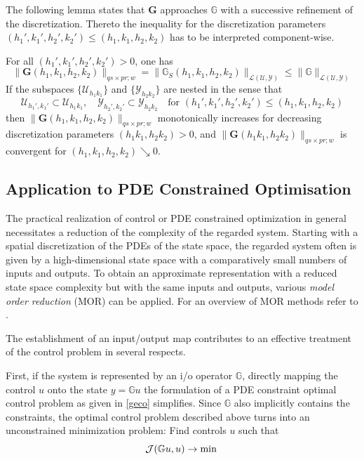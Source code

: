 \documentclass[a4paper,10pt,BCOR=15mm]{scrbook}
\providecommand{\norm}[1]{\lVert#1 \rVert}
\begin{document}
The following lemma states that $\mathbf G$ approaches $\mathbb G$ with a successive refinement of the discretization. Thereto the inequality for the discretization parameters $(h_1',k_1',h_2',k_2') \leq (h_1,k_1,h_2,k_2)$ has to be interpreted component-wise.

\begin{lema}
 For all $(h_1',k_1',h_2',k_2') > 0$, one has
\begin{equation*}
 \norm{ \mathbf G(h_1,k_1,h_2,k_2)}_{qs \times pr ; w} =  \norm{ \mathbb G_S(h_1,k_1,h_2,k_2)}_{\mathscr L(\mathcal U,\mathcal Y)} \leq  \norm{ \mathbb G}_{\mathscr L({\mathcal U,\mathcal Y})}
\end{equation*}
If the subspaces $\{ \mathcal U_{h_1k_1}\}$ and $\{ \mathcal Y_{h_2k_2}\}$ are nested in the sense that
\begin{equation*}
  \mathcal U_{h_1',k_1'}\subset  \mathcal U_{h_1k_1}, \quad \mathcal Y_{h_2',k_2'} \subset \mathcal Y_{h_2k_2} \quad \text{for  }(h_1',k_1',h_2',k_2') \leq (h_1,k_1,h_2,k_2)
\end{equation*}
then $\norm{ \mathbf G(h_1,k_1,h_2,k_2)}_{qs \times pr ; w}$ monotonically increases for decreasing discretization parameters $(h_1k_1,h_2k_2) > 0$, and $\norm{ \mathbf G(h_1k_1,h_2k_2)}_{qs \times pr ; w}$ is convergent for $ (h_1,k_1,h_2,k_2) \searrow 0$.
\end{lema}




\subsection{Application to PDE Constrained Optimisation}

The practical realization of control or PDE constrained optimization in general necessitates a reduction of the complexity of the regarded system. Starting with a spatial discretization of the PDEs of the state space, the regarded system often is given by a high-dimensional state space with a comparatively small numbers of inputs and outputs. To obtain an approximate representation with a reduced state space complexity but with the same inputs and outputs, various \textit{model order reduction} (MOR) can be applied. For an overview of MOR methods refer to \cite{antou, bemeso,schm}.

The establishment of an input/output map contributes to an effective treatment of the control problem in several respects.

First, if the system is represented by an i/o operator $\mathbb G$, directly mapping the control $u$ onto the state $y = \mathbb Gu$ the formulation of a PDE constraint optimal control problem as given in \eqref{geco} simplifies. Since $\mathbb G$ also implicitly contains the constraints, the optimal control problem described above turns into an unconstrained minimization problem: Find controls $u$ such that
\begin{equation*}
 \mathcal J(\mathbb G u,u) \rightarrow \min \\
\end{equation*}
\end{document}
